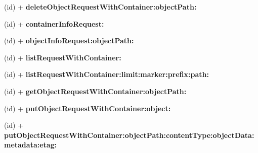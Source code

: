 \begin{DoxyCompactItemize}
\item 
\hypertarget{interface_a_s_i_cloud_files_object_request_a55f1c9c4f71e7e3314b23d144b96fbac}{
(id) + {\bfseries delete\-Object\-Request\-With\-Container\-:object\-Path\-:}}
\label{interface_a_s_i_cloud_files_object_request_a55f1c9c4f71e7e3314b23d144b96fbac}

\item 
\hypertarget{interface_a_s_i_cloud_files_object_request_ab9af59ae6c15be52c702e45fca805db9}{
(id) + {\bfseries container\-Info\-Request\-:}}
\label{interface_a_s_i_cloud_files_object_request_ab9af59ae6c15be52c702e45fca805db9}

\item 
\hypertarget{interface_a_s_i_cloud_files_object_request_a4b4f0ea695cdec431818f4ca24a8a1cf}{
(id) + {\bfseries object\-Info\-Request\-:object\-Path\-:}}
\label{interface_a_s_i_cloud_files_object_request_a4b4f0ea695cdec431818f4ca24a8a1cf}

\item 
\hypertarget{interface_a_s_i_cloud_files_object_request_ad140f7f65fef97218ff5a8853afbc0c7}{
(id) + {\bfseries list\-Request\-With\-Container\-:}}
\label{interface_a_s_i_cloud_files_object_request_ad140f7f65fef97218ff5a8853afbc0c7}

\item 
\hypertarget{interface_a_s_i_cloud_files_object_request_a67e5f2848052dcdf80aac2ffd4f64525}{
(id) + {\bfseries list\-Request\-With\-Container\-:limit\-:marker\-:prefix\-:path\-:}}
\label{interface_a_s_i_cloud_files_object_request_a67e5f2848052dcdf80aac2ffd4f64525}

\item 
\hypertarget{interface_a_s_i_cloud_files_object_request_ac41ac1686f40dd0b25f473b95de56a2b}{
(id) + {\bfseries get\-Object\-Request\-With\-Container\-:object\-Path\-:}}
\label{interface_a_s_i_cloud_files_object_request_ac41ac1686f40dd0b25f473b95de56a2b}

\item 
\hypertarget{interface_a_s_i_cloud_files_object_request_ac9c57b5595d42ea6fdb13b9baa5ad073}{
(id) + {\bfseries put\-Object\-Request\-With\-Container\-:object\-:}}
\label{interface_a_s_i_cloud_files_object_request_ac9c57b5595d42ea6fdb13b9baa5ad073}

\item 
\hypertarget{interface_a_s_i_cloud_files_object_request_a51fd51b32cb64756aa6fbc3f50ff7df4}{
(id) + {\bfseries put\-Object\-Request\-With\-Container\-:object\-Path\-:content\-Type\-:object\-Data\-:metadata\-:etag\-:}}
\label{interface_a_s_i_cloud_files_object_request_a51fd51b32cb64756aa6fbc3f50ff7df4}


\end{DoxyCompactItemize}
